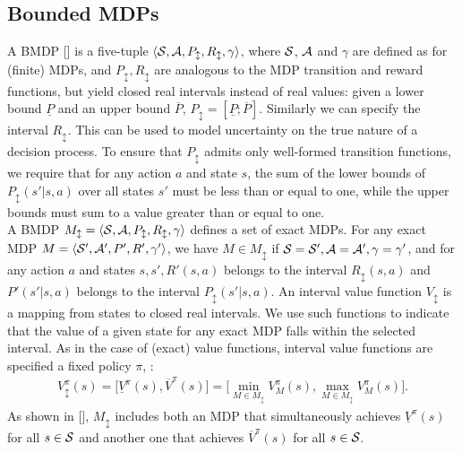\subsection{Bounded \ac{MDPs}} \label{subsec:bmdp}
A \acf{BMDP} [\cite{givan2000bounded}] is a five-tuple $\langle \mathcal{S}, \mathcal{A}, P_{\updownarrow}, R_{\updownarrow}, \gamma \rangle$, where $\mathcal{S}$, $\mathcal{A}$ and $\gamma$ are defined as for (finite) \ac{MDPs}, and $P_{\updownarrow}, R_{\updownarrow}$ are analogous to the \ac{MDP} transition and reward functions, but yield closed real intervals instead of real values: given a lower bound $\underline{P}$ and an upper bound $\overline{P}$, $P_{\updownarrow} = [\underline{P}; \overline{P}]$. Similarly we can specify the interval $R_{\updownarrow}$. This can be used to model uncertainty on the true nature of a decision process. To ensure that $P_{\updownarrow}$ admits only well-formed transition functions, we require that for any action $a$ and state $s$, the sum of the lower bounds of $P_{\updownarrow}(s'|s,a)$ over all states $s'$ must be less than or equal to one, while the upper bounds must sum to a value greater than or equal to one.\\
\newline
A \ac{BMDP} $M_{\updownarrow} = \langle \mathcal{S}, \mathcal{A}, P_{\updownarrow}, R_{\updownarrow}, \gamma \rangle$ defines a set of exact \ac{MDPs}. For any exact \ac{MDP} $M = \langle \mathcal{S}', \mathcal{A}', P', R', \gamma' \rangle$, we have $M \in M_{\updownarrow}$ if $\mathcal{S} = \mathcal{S}', \mathcal{A} = \mathcal{A}', \gamma = \gamma'$, and for any action $a$ and states $s, s', R'(s,a)$ belongs to the interval $R_{\updownarrow}(s,a)$ and $P'(s'|s,a)$ belongs to the interval $P_{\updownarrow}(s'|s,a)$. An interval value function $V_{\updownarrow}$ is a mapping from states to closed real intervals. We use such functions to indicate that the value of a given state for any exact \ac{MDP} falls within the selected interval. As in the case of (exact) value functions, interval value functions are specified \wrt a fixed policy $\pi$, \ie:
\begin{align} V_{\updownarrow}^{\pi}(s) = \Big[ \underline{V}^{\pi}(s), \overline{V}^{\pi}(s)\Big] = \Big[ \min_{M \in M_{\updownarrow}} V_{M}^{\pi}(s), \max_{M \in M_{\updownarrow}} V_{M}^{\pi}(s)\Big]. \end{align}
As shown in [\cite{givan2000bounded}], $M_{\updownarrow}$ includes both an \ac{MDP} that simultaneously achieves $\underline{V}^{\pi}(s)$ for all $s \in \mathcal{S}$ and another one that achieves $\overline{V}^{\pi}(s)$ for all $s \in \mathcal{S}$.\\
